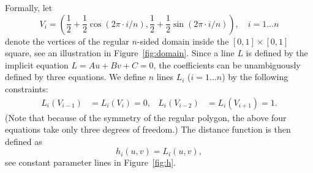 \documentclass[9pt,academicons]{article}
\begin{document}
Formally, let
\begin{equation}
  V_i=\left(\frac{1}{2}+\frac{1}{2}\cos(2\pi\cdot i/n),
            \frac{1}{2}+\frac{1}{2}\sin(2\pi\cdot i/n)\right),\quad i=1\dots n
\end{equation}
denote the vertices of the regular $n$-sided domain inside the $[0,1]\times[0,1]$ square,
see an illustration in Figure~\ref{fig:domain}. %
Since a line $L$ is defined by the implicit equation $L=Au+Bv+C=0$, the coefficients can
be unambiguously defined by three equations. We define $n$ lines
$L_i$ ($i=1\dots n$) by the following constraints:
\begin{align}
  L_i(V_{i-1})&=L_i(V_i)=0, & L_i(V_{i-2})&=L_i(V_{i+1})=1.
\end{align}
(Note that because of the symmetry of the regular polygon, the above four equations take
only three degrees of freedom.) The distance function is then defined as
\begin{equation}
  h_i(u,v)=L_i(u,v),
\end{equation}
see constant parameter lines in Figure~\ref{fig:h}.
\end{document}
